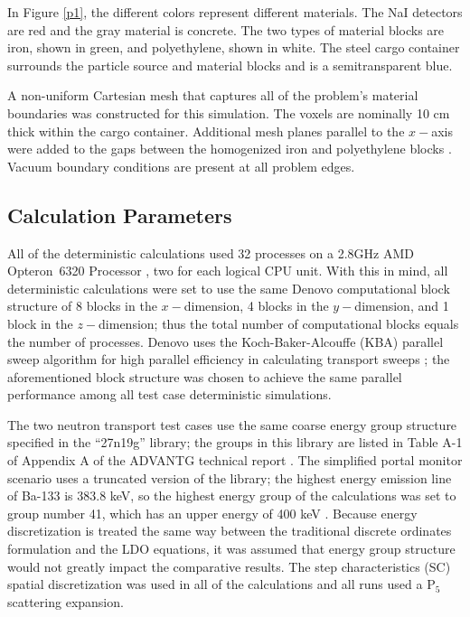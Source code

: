 \documentclass{article} %
\begin{document}
In Figure \ref{p1}, the different colors represent different materials. The NaI
detectors are red and the gray material is concrete. The two types of material
blocks are iron, shown in green, and polyethylene, shown in white. The steel
cargo container surrounds the particle source and material blocks and is a
semitransparent blue.

A non-uniform Cartesian mesh that captures all of the problem's material
boundaries was constructed for this simulation. The voxels are nominally 10 cm
thick within the cargo container. Additional mesh planes parallel to the
$x-$axis were added to the gaps between the homogenized iron and polyethylene
blocks \cite{advantg}. Vacuum boundary conditions are present at all problem
edges.

\subsection{Calculation Parameters}

All of the deterministic calculations used 32 processes on a 2.8GHz AMD 
Opteron\texttrademark\ 6320 Processor \cite{amd}, two for each logical CPU
unit. With this in mind, all deterministic calculations were set to use the
same Denovo computational block structure of 8 blocks 
in the $x-$dimension, 4 blocks in the $y-$dimension, and 1 block in the 
$z-$dimension; thus the total number of computational blocks equals the number
of processes. Denovo uses the Koch-Baker-Alcouffe (KBA) parallel sweep
algorithm for high parallel efficiency in calculating transport sweeps
\cite{denovo}; the aforementioned block structure was chosen to achieve the
same parallel performance among all test case deterministic simulations. 

The two neutron transport test cases use the same coarse energy group structure
specified in  the ``27n19g'' library; the groups in this library are listed in 
Table A-1 of Appendix A of the ADVANTG technical report \cite{advantg}.
The simplified portal monitor scenario uses a truncated version of the library;
the highest energy emission line of Ba-133 is 383.8 keV, so the highest energy
group of the calculations was set to group number 41, which has an upper energy
of 400 keV \cite{advantg}. Because 
energy discretization is treated the same way between the traditional discrete
ordinates formulation and the LDO equations, it was assumed that energy group 
structure would not greatly impact the comparative results.
The step characteristics (SC) spatial discretization was used in all of the
calculations and all runs used a P$_5$ scattering expansion.
\end{document}
